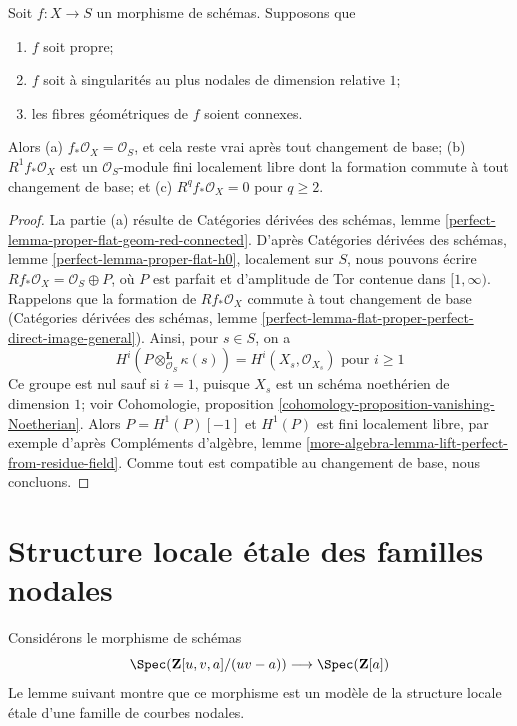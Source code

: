 \begin{lemma}
\label{lemma-genus-in-nodal-family-of-curves}
Soit $f : X \to S$ un morphisme de schémas. Supposons que \begin{enumerate} \item $f$ soit propre; \item $f$ soit à singularités au plus nodales de dimension relative $1$; \item les fibres géométriques de $f$ soient connexes. \end{enumerate} Alors (a) $f_*\mathcal{O}_X = \mathcal{O}_S$, et cela reste vrai après tout changement de base; (b) $R^1f_*\mathcal{O}_X$ est un $\mathcal{O}_S$-module fini localement libre dont la formation commute à tout changement de base; et (c) $R^qf_*\mathcal{O}_X = 0$ pour $q \geq 2$.
\end{lemma}

\begin{proof}
La partie (a) résulte de Catégories dérivées des schémas, lemme \ref{perfect-lemma-proper-flat-geom-red-connected}. D'après Catégories dérivées des schémas, lemme \ref{perfect-lemma-proper-flat-h0}, localement sur $S$, nous pouvons écrire $Rf_*\mathcal{O}_X = \mathcal{O}_S \oplus P$, où $P$ est parfait et d'amplitude de Tor contenue dans $[1, \infty)$. Rappelons que la formation de $Rf_*\mathcal{O}_X$ commute à tout changement de base (Catégories dérivées des schémas, lemme \ref{perfect-lemma-flat-proper-perfect-direct-image-general}). Ainsi, pour $s \in S$, on a $$
H^i(P \otimes_{\mathcal{O}_S}^\mathbf{L} \kappa(s)) =
H^i(X_s, \mathcal{O}_{X_s})
\text{ pour }i \geq 1
$$ Ce groupe est nul sauf si $i = 1$, puisque $X_s$ est un schéma noethérien de dimension $1$; voir Cohomologie, proposition \ref{cohomology-proposition-vanishing-Noetherian}. Alors $P = H^1(P)[-1]$ et $H^1(P)$ est fini localement libre, par exemple d'après Compléments d'algèbre, lemme \ref{more-algebra-lemma-lift-perfect-from-residue-field}. Comme tout est compatible au changement de base, nous concluons.
\end{proof}





\section{Structure locale étale des familles nodales}
\label{section-etale-local-nodal}


\noindent
Considérons le morphisme de schémas $$
\Spec(\mathbf{Z}[u, v, a]/(uv - a))
\longrightarrow
\Spec(\mathbf{Z}[a])
$$ Le lemme suivant montre que ce morphisme est un modèle de la structure locale étale d'une famille de courbes nodales.

